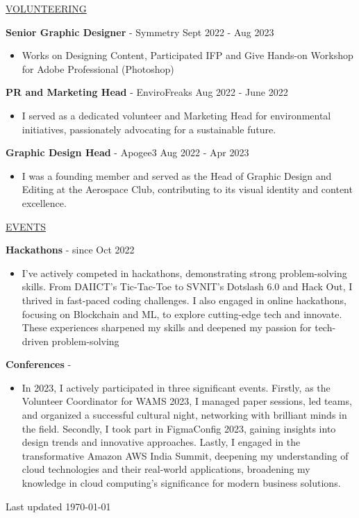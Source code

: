 \documentclass[11pt]{article}
\newcommand{\betteruline}[1]{
    \uline{#1}
}
\newcommand{\sectiontitle}[1]{
    \begingroup
        \titlebold
        \betteruline{\Large\uppercase{#1}  }
        \vspace{1.7mm}
    \endgroup
}
\newcommand{\sectioncontent}[1]{
    \begingroup
        \begin{FlushLeft}
        \vspace{-3mm}
        \sffamily\small#1
        \end{FlushLeft}
    \endgroup
    \vspace{2mm}
}
\newcommand{\job}[3]{
    \begingroup
        \textbf{\small#1} - \small#2
        \hfill\color{black!70}\small{#3}
    \endgroup
}
\newcommand{\spacevv}{
    \vspace{2mm}
}
\begin{document}
\begin{paracol}{2}
{    }

    \sectiontitle{volunteering}
    \sectioncontent{
      
          \job{Senior Graphic Designer}{Symmetry}{Sept 2022 - Aug 2023}
          \begin{itemize}
            \item Works on Designing Content, Participated IFP and Give Hands-on Workshop for Adobe Professional (Photoshop)
          \end{itemize}
          \spacevv
        
          \job{PR and Marketing Head}{EnviroFreaks}{Aug 2022 - June 2022}
          \begin{itemize}
            \item I served as a dedicated volunteer and Marketing Head for environmental initiatives, passionately advocating for a sustainable future.
          \end{itemize}
            \spacevv

        
          \job{Graphic Design Head}{Apogee3}{Aug 2022 - Apr 2023}
          \begin{itemize}
            \item I was a founding member and served as the Head of Graphic Design and Editing at the Aerospace Club, contributing to its visual identity and content excellence.
          \end{itemize}
          \spacevv

    }
    
    \sectiontitle{Events}
    \sectioncontent{
      
          \job{Hackathons}{}{since Oct 2022}
          \begin{itemize}
            \item I've actively competed in hackathons, demonstrating strong problem-solving skills. From DAIICT's Tic-Tac-Toe to SVNIT's Dotslash 6.0 and Hack Out, I thrived in fast-paced coding challenges. I also engaged in online hackathons, focusing on Blockchain and ML, to explore cutting-edge tech and innovate. These experiences sharpened my skills and deepened my passion for tech-driven problem-solving
          \end{itemize}
          \spacevv

          \job{Conferences}{}{}
          \begin{itemize}
            \item In 2023, I actively participated in three significant events. Firstly, as the Volunteer Coordinator for WAMS 2023, I managed paper sessions, led teams, and organized a successful cultural night, networking with brilliant minds in the field. Secondly, I took part in FigmaConfig 2023, gaining insights into design trends and innovative approaches. Lastly, I engaged in the transformative Amazon AWS India Summit, deepening my understanding of cloud technologies and their real-world applications, broadening my knowledge in cloud computing's significance for modern business solutions.
          \end{itemize}
          \spacevv
    }

    \normaltext \hfill \tiny Last updated \today

    \end{paracol}
\end{document}
